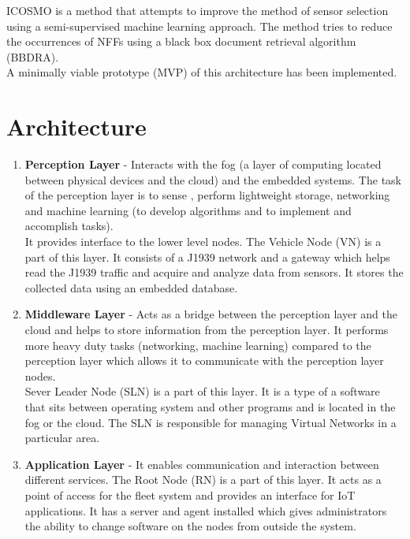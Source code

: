 \documentclass{report}
\begin{document}
    ICOSMO is a method that attempts to improve the method of sensor selection using a semi-supervised machine learning approach. The method tries to reduce the occurrences of NFFs using a black box document retrieval algorithm (BBDRA).\\
        
        A minimally viable prototype (MVP) of this architecture has been implemented.
    
    \section*{Architecture}
    \begin{enumerate}
        \item \textbf{Perception Layer}  - Interacts with the fog (a layer of computing located between physical devices and the cloud) and the embedded systems. The task of the perception layer is to  sense , perform lightweight storage, networking and machine learning (to develop algorithms and to implement and accomplish tasks). \\																		It provides interface to the lower level nodes. The Vehicle Node (VN) is a part of this layer. It consists of a J1939 network and a gateway which helps read the J1939 traffic and acquire and analyze data from sensors. It stores the collected data using an embedded database.\\

        \item \textbf{Middleware Layer} - Acts as a bridge between the perception layer and the cloud and helps to store information from the perception layer. It performs more heavy duty tasks (networking, machine learning) compared to the perception layer which allows it to communicate with the perception layer nodes.  		\\																							Sever Leader Node (SLN) is a part of this layer. It is a type of a software that sits between operating system and other programs and is located in the fog or the cloud. The SLN is responsible for managing Virtual Networks in a particular area.     \\                                                                                                                       																																								
        \item \textbf{Application Layer} - It enables communication and interaction between different services. The Root Node (RN) is a part of this layer. It acts as a point of access for the fleet system and provides an interface for IoT applications. It has a server and agent installed which gives administrators the ability to change software on the nodes from outside the system.

    \end{enumerate}
\end{document}
